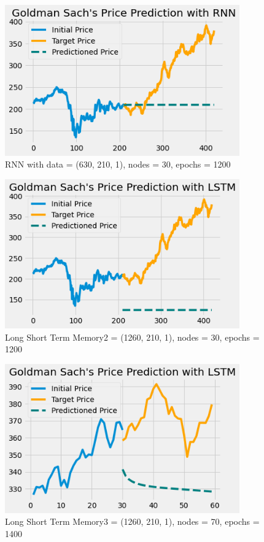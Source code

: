 \documentclass[12pt]{article}
\begin{document}
\begin{itemize}
\begin{figure}[H]
  \centering
  \includegraphics[width=0.9\textwidth]{figures/rnn2.png}
  \caption{RNN with data = (630, 210, 1), nodes = 30, epochs = 1200}\label{rnn2}
\end{figure}

\begin{figure}[H]
  \centering
  \includegraphics[width=0.9\textwidth]{figures/lstm2.png}
  \caption{Long Short Term Memory2 = (1260, 210, 1), nodes = 30, epochs = 1200}\label{lstm2}
\end{figure}

\begin{figure}[H]
  \centering
  \includegraphics[width=0.9\textwidth]{figures/lstm3.png}
  \caption{Long Short Term Memory3 = (1260, 210, 1), nodes = 70, epochs = 1400}\label{lstm3}
\end{figure}


\end{itemize}
\end{document}
